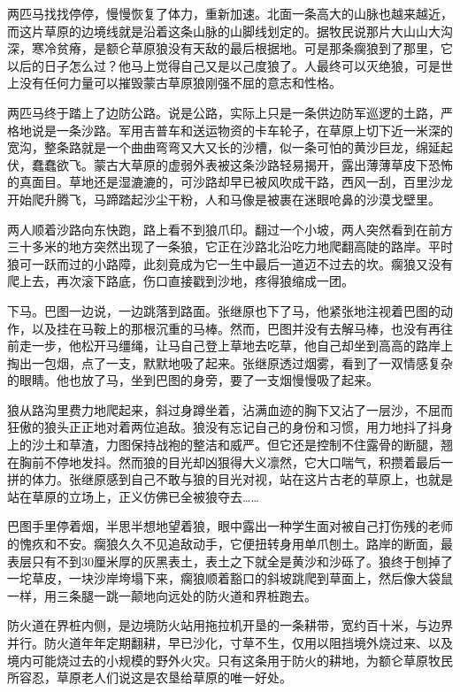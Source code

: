 \par 两匹马找找停停，慢慢恢复了体力，重新加速。北面一条高大的山脉也越来越近，而这片草原的边境线就是沿着这条山脉的山脚线划定的。据牧民说那片大山山大沟深，寒冷贫瘠，是额仑草原狼没有天敌的最后根据地。可是那条瘸狼到了那里，它以后的日子怎么过？他马上觉得自己又是以己度狼了。人最终可以灭绝狼，可是世上没有任何力量可以摧毁蒙古草原狼刚强不屈的意志和性格。
\par 两匹马终于踏上了边防公路。说是公路，实际上只是一条供边防军巡逻的土路，严格地说是一条沙路。军用吉普车和送运物资的卡车轮子，在草原上切下近一米深的宽沟，整条路就是一个曲曲弯弯又大又长的沙槽，似一条可怕的黄沙巨龙，绵延起伏，蠢蠢欲飞。蒙古大草原的虚弱外表被这条沙路轻易揭开，露出薄薄草皮下恐怖的真面目。草地还是湿漉漉的，可沙路却早已被风吹成干路，西风一刮，百里沙龙开始爬升腾飞，马蹄踏起沙尘干粉，人和马像是被裹在迷眼呛鼻的沙漠戈壁里。
\par 两人顺着沙路向东快跑，路上看不到狼爪印。翻过一个小坡，两人突然看到在前方三十多米的地方突然出现了一条狼，它正在沙路北沿吃力地爬翻高陡的路岸。平时狼可一跃而过的小路障，此刻竟成为它一生中最后一道迈不过去的坎。瘸狼又没有爬上去，再次滚下路底，伤口直接戳到沙地，疼得狼缩成一团。
\par 下马。巴图一边说，一边跳落到路面。张继原也下了马，他紧张地注视着巴图的动作，以及挂在马鞍上的那根沉重的马棒。然而，巴图并没有去解马棒，也没有再往前走一步，他松开马缰绳，让马自己登上草地去吃草，他自己却坐到高高的路岸上掏出一包烟，点了一支，默默地吸了起来。张继原透过烟雾，看到了一双情感复杂的眼睛。他也放了马，坐到巴图的身旁，要了一支烟慢慢吸了起来。
\par 狼从路沟里费力地爬起来，斜过身蹲坐着，沾满血迹的胸下又沾了一层沙，不屈而狂傲的狼头正正地对着两位追敌。狼没有忘记自己的身份和习惯，用力地抖了抖身上的沙土和草渣，力图保持战袍的整洁和威严。但它还是控制不住露骨的断腿，翘在胸前不停地发抖。然而狼的目光却凶狠得大义凛然，它大口喘气，积攒着最后一拼的体力。张继原感到自己不敢与狼的目光对视，站在这片古老的草原上，也就是站在草原的立场上，正义仿佛已全被狼夺去……
\par 巴图手里停着烟，半思半想地望着狼，眼中露出一种学生面对被自己打伤残的老师的愧疚和不安。瘸狼久久不见追敌动手，它便扭转身用单爪刨土。路岸的断面，最表层只有不到30厘米厚的灰黑表土，表土之下就全是黄沙和沙砾了。狼终于刨掉了一坨草皮，一块沙岸垮塌下来，瘸狼顺着豁口的斜坡跳爬到草面上，然后像大袋鼠一样，用三条腿一跳一颠地向远处的防火道和界桩跑去。
\par 防火道在界桩内侧，是边境防火站用拖拉机开垦的一条耕带，宽约百十米，与边界并行。防火道年年定期翻耕，早已沙化，寸草不生，仅用以阻挡境外烧过来、以及境内可能烧过去的小规模的野外火灾。只有这条用于防火的耕地，为额仑草原牧民所容忍，草原老人们说这是农垦给草原的唯一好处。
